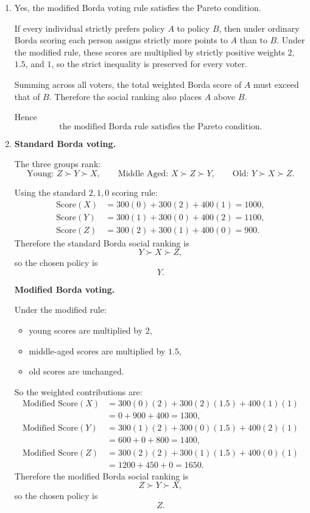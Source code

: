 \documentclass[12pt]{article}
\begin{document}
\begin{enumerate}[label=(\alph*)]
    \item
    Yes, the modified Borda voting rule satisfies the Pareto condition.

    If every individual strictly prefers policy \(A\) to policy \(B\), then under ordinary Borda scoring each person assigns strictly more points to \(A\) than to \(B\). Under the modified rule, these scores are multiplied by strictly positive weights \(2\), \(1.5\), and \(1\), so the strict inequality is preserved for every voter.

    Summing across all voters, the total weighted Borda score of \(A\) must exceed that of \(B\). Therefore the social ranking also places \(A\) above \(B\).

    Hence
    \[
    \boxed{\text{the modified Borda rule satisfies the Pareto condition.}}
    \]

    \item
    \textbf{Standard Borda voting.}

    The three groups rank:
    \[
    \text{Young: } Z \succ Y \succ X,
    \qquad
    \text{Middle Aged: } X \succ Z \succ Y,
    \qquad
    \text{Old: } Y \succ X \succ Z.
    \]

    Using the standard \(2,1,0\) scoring rule:
    \[
    \begin{aligned}
    \text{Score}(X)
    &=300(0)+300(2)+400(1)=1000,\\
    \text{Score}(Y)
    &=300(1)+300(0)+400(2)=1100,\\
    \text{Score}(Z)
    &=300(2)+300(1)+400(0)=900.
    \end{aligned}
    \]
    Therefore the standard Borda social ranking is
    \[
    Y \succ X \succ Z,
    \]
    so the chosen policy is
    \[
    \boxed{Y.}
    \]

    \bigskip

    \textbf{Modified Borda voting.}

    Under the modified rule:
    \begin{itemize}[leftmargin=*]
        \item young scores are multiplied by \(2\),
        \item middle-aged scores are multiplied by \(1.5\),
        \item old scores are unchanged.
    \end{itemize}

    So the weighted contributions are:
    \[
    \begin{aligned}
    \text{Modified Score}(X)
    &=300(0)(2)+300(2)(1.5)+400(1)(1)\\
    &=0+900+400=1300,\\
    \text{Modified Score}(Y)
    &=300(1)(2)+300(0)(1.5)+400(2)(1)\\
    &=600+0+800=1400,\\
    \text{Modified Score}(Z)
    &=300(2)(2)+300(1)(1.5)+400(0)(1)\\
    &=1200+450+0=1650.
    \end{aligned}
    \]
    Therefore the modified Borda social ranking is
    \[
    Z \succ Y \succ X,
    \]
    so the chosen policy is
    \[
    \boxed{Z.}
    \]


\end{enumerate}
\end{document}

